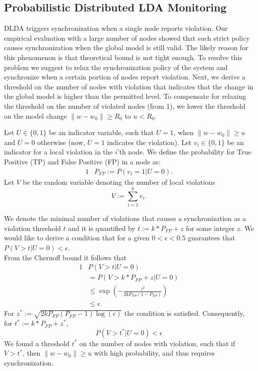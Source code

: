 \documentclass{sig-alternate-05-2015}
\begin{document}
\subsection{Probabilistic Distributed LDA Monitoring}\label{sec:PDLDA}

DLDA triggers synchronization when a single node reports violation.
Our empirical evaluation with a large number of nodes showed that such strict
policy causes synchronization when the global model is still valid. The likely
reason for this phenomenon is that theoretical bound is not tight enough.
To resolve this problem we suggest to relax the synchronization policy of
the system and synchronize when a certain portion of nodes report violation.
Next, we derive a threshold on the number of nodes with violation that indicates
that the change in the global model is higher than the permitted level.
To compensate for relaxing the threshold on the number of violated nodes
(from 1), we lower the threshold on the model change $\|w-w_0\| \geq R_0$
to $u<R_0$.

Let $U\in\{0,1\}$ be an indicator variable, such that $U=1$,
when $\|w-w_0\| \geq u$ and $U=0$ otherwise (now, $U=1$ indicates the violation).
Let $v_i \in \{0,1\}$ be an indicator for a local violation in the
$i$'th node. We define the probability for True Positive (TP) and False Positive
(FP) in a node as:
\begin{alignat*}{1}
& P_{FP} := P(v_i=1 | U=0).
\end{alignat*}
Let $V$ be the random variable denoting the number of local violations
\begin{equation*}
V := \sum_{i=1}^k v_i.
\end{equation*}

We denote the minimal number of violations that causes a synchronization
as a violation threshold $t$ and it is quantified by
$t:=k*P_{FP}+z$ for some integer $z$.
We would like to derive a condition that for a given $0 < \epsilon < 0.5$
guarantees that
$P(V>t|U=0) < \epsilon$.
\\From the Chernoff bound it follows that
\begin{alignat*}{1}
& P(V>t | U=0) \\
& = P(V>k*P_{FP}+z | U=0) \\
& \leq \exp(-\frac{z^2}{2kP_{FP}(1-P_{FP})}) \\
& \leq \epsilon.
\end{alignat*}
For $z^*:=\sqrt{2kP_{FP}(P_{FP}-1)\log(\epsilon)}$ the condition is satisfied.
Consequently, for $t^*:=k*P_{FP}+z^*$,  $$P(V > t^*|U=0) <
\epsilon$$
We found a threshold $t^*$ on the number of nodes with violation, such that if $V > t^*$,  then
$\|w-w_0\| \geq u$ with high probability, and thus requires synchronization.
\end{document}
